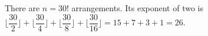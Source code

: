 There are $n=30!$ arrangements. Its exponent of two is $\lfloor\dfrac{30}{2}\rfloor+\lfloor\dfrac{30}{4}\rfloor+\lfloor\dfrac{30}{8}\rfloor+\lfloor\dfrac{30}{16}\rfloor=15+7+3+1=\boxed{26}$.
